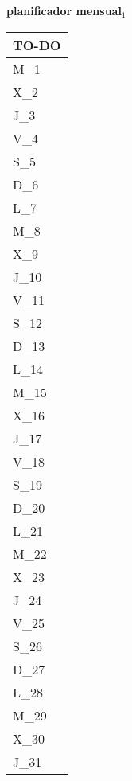 \clearpage
\raggedright{
	\fontsize{25}{50}\selectfont
	\textbf{\NextYear}
}\scriptsize{\textbf{planificador mensual$_1$}}\\[11.3pt]



	\noindent\dotfill
	\renewcommand{\arraystretch}{1.5}\scriptsize
		\begin{longtabu} to \textwidth { X[l]}
		\centering \small{\textbf{TO-DO}} \\
		\toprule
		M_{1} \dotfill\\
		X_{2} \dotfill\\
		J_{3} \dotfill\\
		V_{4} \dotfill\\
		S_{5} \dotfill\\
		D_{6} \dotfill\\
		\hline
		L_{7} \dotfill\\
		M_{8} \dotfill\\
		X_{9} \dotfill\\
		J_{10} \dotfill\\
		V_{11} \dotfill\\
		S_{12} \dotfill\\
		D_{13} \dotfill\\
		\hline
		L_{14} \dotfill\\
		M_{15} \dotfill\\
		X_{16} \dotfill\\
		J_{17} \dotfill\\
		V_{18} \dotfill\\
		S_{19} \dotfill\\
		D_{20} \dotfill\\
		\hline
		L_{21} \dotfill\\
		M_{22} \dotfill\\
		X_{23} \dotfill\\
		J_{24} \dotfill\\
		V_{25} \dotfill\\
		S_{26} \dotfill\\
		D_{27} \dotfill\\
		\hline
		L_{28} \dotfill\\
		M_{29} \dotfill\\
		X_{30} \dotfill\\
		J_{31} \dotfill\\

		\bottomrule

	\end{longtabu}


\clearpage

